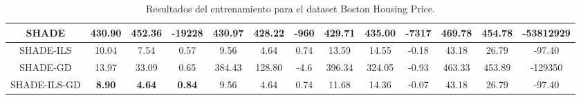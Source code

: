 \begin{table}[H]
{\begin{tabular}{|c|ccc|ccc|ccc|ccc|}
SHADE                                                & \multicolumn{1}{c|}{430.90}        & \multicolumn{1}{c|}{452.36}        & -19228        & \multicolumn{1}{c|}{430.97}          & \multicolumn{1}{c|}{428.22}        & -960          & \multicolumn{1}{c|}{429.71}          & \multicolumn{1}{c|}{435.00}        & -7317         & \multicolumn{1}{c|}{469.78}         & \multicolumn{1}{c|}{454.78}        & -53812929     \\ \hline
SHADE-ILS                                            & \multicolumn{1}{c|}{10.04}         & \multicolumn{1}{c|}{7.54}          & 0.57          & \multicolumn{1}{c|}{9.56}            & \multicolumn{1}{c|}{4.64}          & 0.74          & \multicolumn{1}{c|}{13.59}           & \multicolumn{1}{c|}{14.55}         & -0.18         & \multicolumn{1}{c|}{43.18}          & \multicolumn{1}{c|}{26.79}         & -97.40        \\ \hline
SHADE-GD                                             & \multicolumn{1}{c|}{13.97}         & \multicolumn{1}{c|}{33.09}         & 0.65          & \multicolumn{1}{c|}{384.43}          & \multicolumn{1}{c|}{128.80}        & -4.6          & \multicolumn{1}{c|}{396.34}          & \multicolumn{1}{c|}{324.05}        & -0.93         & \multicolumn{1}{c|}{463.33}         & \multicolumn{1}{c|}{453.89}        & -129350       \\ \hline
SHADE-ILS-GD                                         & \multicolumn{1}{c|}{\textbf{8.90}} & \multicolumn{1}{c|}{\textbf{4.64}} & \textbf{0.84} & \multicolumn{1}{c|}{9.56}            & \multicolumn{1}{c|}{4.64}          & 0.74          & \multicolumn{1}{c|}{11.68}           & \multicolumn{1}{c|}{14.36}         & -0.07         & \multicolumn{1}{c|}{43.18}          & \multicolumn{1}{c|}{26.79}         & -97.40        \\ \hline
\end{tabular}}
\caption{Resultados del entrenamiento para el dataset Boston Housing Price.}
\label{tab:bhp}
\end{table}




